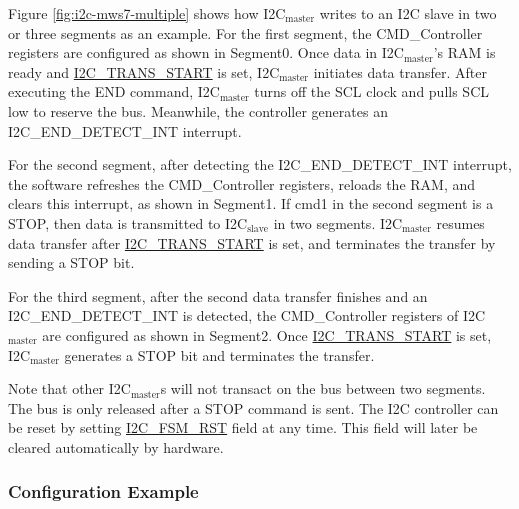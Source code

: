 \documentclass[main\_\_EN.tex]{subfiles}
\begin{document}
Figure \ref{fig:i2c-mws7-multiple} shows how I2C$_\text{master}$ writes to an I2C slave in two or three segments as an example. For the first segment, the CMD\_Controller registers are configured as shown in Segment0. Once data in I2C$_\text{master}$'s RAM is ready and \hyperref[fielddesc:I2CTRANSSTART]{I2C\_TRANS\_START} is set, I2C$_\text{master}$ initiates data transfer. After executing the END command, I2C$_\text{master}$ turns off the SCL clock and pulls SCL low to reserve the bus. Meanwhile, the controller generates an I2C\_END\_DETECT\_INT interrupt.

For the second segment, after detecting the I2C\_END\_DETECT\_INT interrupt, the software refreshes the CMD\_Controller registers, reloads the RAM, and clears this interrupt, as shown in Segment1. If cmd1 in the second segment is a STOP, then data is transmitted to I2C$_\text{slave}$ in two segments. I2C$_\text{master}$ resumes data transfer after \hyperref[fielddesc:I2CTRANSSTART]{I2C\_TRANS\_START} is set, and terminates the transfer by sending a STOP bit.

For the third segment, after the second data transfer finishes and an I2C\_END\_DETECT\_INT is detected, the CMD\_Controller registers of I2C$_\text{master}$ are configured as shown in Segment2. Once \hyperref[fielddesc:I2CTRANSSTART]{I2C\_TRANS\_START} is set, I2C$_\text{master}$ generates a STOP bit and terminates the transfer.

Note that other I2C$_\text{master}$s will not transact on the bus between two segments. The bus is only released after a STOP command is sent. The I2C controller can be reset by setting \hyperref[fielddesc:I2CFSMRST]{I2C\_FSM\_RST} field at any time. This field will later be cleared automatically by hardware.

\subsubsection{Configuration Example}
\end{document}
